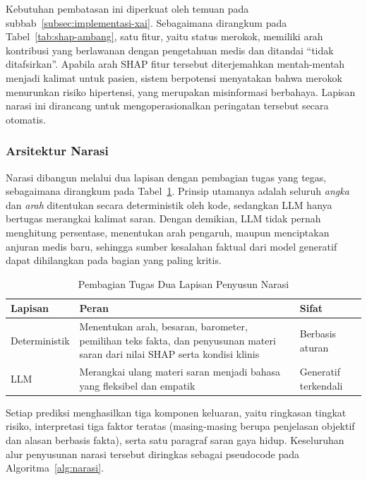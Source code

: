 Kebutuhan pembatasan ini diperkuat oleh temuan pada subbab~\ref{subsec:implementasi-xai}. Sebagaimana dirangkum pada Tabel~\ref{tab:shap-ambang}, satu fitur, yaitu status merokok, memiliki arah kontribusi yang berlawanan dengan pengetahuan medis dan ditandai ``tidak ditafsirkan''. Apabila arah SHAP fitur tersebut diterjemahkan mentah-mentah menjadi kalimat untuk pasien, sistem berpotensi menyatakan bahwa merokok menurunkan risiko hipertensi, yang merupakan misinformasi berbahaya. Lapisan narasi ini dirancang untuk mengoperasionalkan peringatan tersebut secara otomatis.

\subsubsection{Arsitektur Narasi}

Narasi dibangun melalui dua lapisan dengan pembagian tugas yang tegas, sebagaimana dirangkum pada Tabel~\ref{tab:arsitektur-narasi}. Prinsip utamanya adalah seluruh \emph{angka} dan \emph{arah} ditentukan secara deterministik oleh kode, sedangkan LLM hanya bertugas merangkai kalimat saran. Dengan demikian, LLM tidak pernah menghitung persentase, menentukan arah pengaruh, maupun menciptakan anjuran medis baru, sehingga sumber kesalahan faktual dari model generatif dapat dihilangkan pada bagian yang paling kritis.

\begin{table}[htbp]
    \centering
    \caption{Pembagian Tugas Dua Lapisan Penyusun Narasi}
    \label{tab:arsitektur-narasi}
    \begin{tabularx}{\textwidth}{@{}l X l@{}}
        \toprule
        \textbf{Lapisan} & \textbf{Peran} & \textbf{Sifat} \\
        \midrule
        Deterministik & Menentukan arah, besaran, barometer, pemilihan teks fakta, dan penyusunan materi saran dari nilai SHAP serta kondisi klinis & Berbasis aturan \\
        LLM           & Merangkai ulang materi saran menjadi bahasa yang fleksibel dan empatik & Generatif terkendali \\
        \bottomrule
    \end{tabularx}
\end{table}

Setiap prediksi menghasilkan tiga komponen keluaran, yaitu ringkasan tingkat risiko, interpretasi tiga faktor teratas (masing-masing berupa penjelasan objektif dan alasan berbasis fakta), serta satu paragraf saran gaya hidup. Keseluruhan alur penyusunan narasi tersebut diringkas sebagai pseudocode pada Algoritma~\ref{alg:narasi}.

